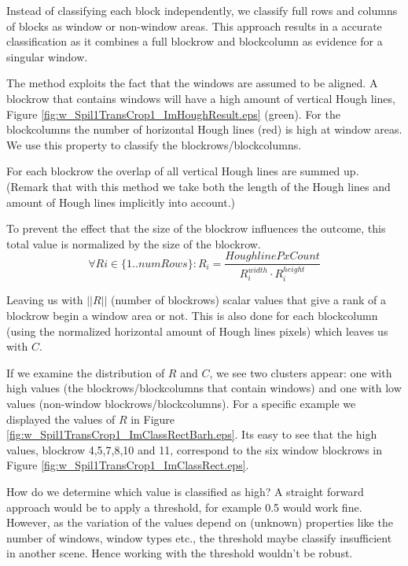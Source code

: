 Instead of classifying each block independently, we classify full rows and
columns of blocks as window or non-window areas.  This approach results in a accurate
classification as it combines a full blockrow and blockcolumn as evidence for a singular
window. 

The method exploits the fact that the windows are assumed to be
aligned.
A blockrow that contains windows will have a high amount of vertical
Hough lines, Figure \ref{fig:w_Spil1TransCrop1_ImHoughResult.eps}
(green). For the blockcolumns the number of horizontal Hough lines
 (red) is high at window areas.  We use this property to classify 
 the blockrows/blockcolumns. 

For each blockrow the overlap of all vertical Hough lines are summed up.
(Remark that with this method we take both the length of the Hough lines and
amount of Hough lines implicitly into account.)

To prevent the effect that the size of the blockrow influences the outcome, this total value
is normalized by the size of the blockrow.
\[\forall Ri\in \{1..numRows\} : R_i = \frac{HoughlinePxCount}{R_i^{width} \cdot R_i^{height}}\]

Leaving us with $||R||$ (number of blockrows) scalar values that give a rank of a blockrow begin a window area or not.
This is also done for each blockcolumn (using the normalized horizontal amount of
Hough lines pixels) which leaves us with $C$.

If we examine the distribution of $R$ and $C$, we see two clusters appear: one with
high values (the blockrows/blockcolumns that contain windows) and one with low
values (non-window blockrows/blockcolumns). For a specific example we displayed the values of $R$ in Figure \ref{fig:w_Spil1TransCrop1_ImClassRectBarh.eps}.
Its easy to see that the high values, blockrow 4,5,7,8,10 and 11, correspond to the
six window blockrows in Figure \ref{fig:w_Spil1TransCrop1_ImClassRect.eps}.

How do we determine which value is classified as high?  A straight forward
approach would be to apply a threshold, for example 0.5 would work fine.
However, as the variation of the values depend on (unknown) properties like the
number of windows, window types etc., the threshold maybe classify insufficient
in another scene.  Hence working with the threshold wouldn't be robust. 

